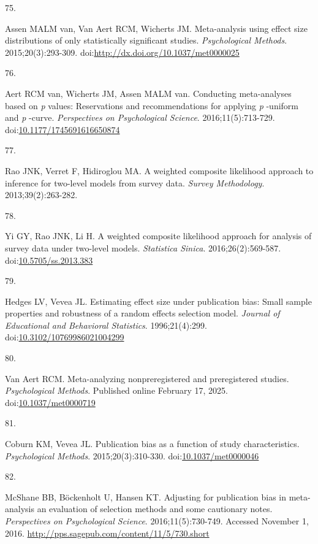 \documentclass[
  american,
  man, donotrepeattitle,floatsintext]{apa7}
\newlength{\cslhangindent}
\newlength{\csllabelwidth}
\newenvironment{CSLReferences}[2] %
 {\begin{list}{}{%
  \setlength{\itemindent}{0pt}
  \setlength{\leftmargin}{0pt}
  \setlength{\parsep}{0pt}
  \ifodd #1
   \setlength{\leftmargin}{\cslhangindent}
   \setlength{\itemindent}{-1\cslhangindent}
  \fi
  \setlength{\itemsep}{#2\baselineskip}}}
 {\end{list}}
\newcommand{\CSLLeftMargin}[1]{\parbox[t]{\csllabelwidth}{\strut#1\strut}}
\newcommand{\CSLRightInline}[1]{\parbox[t]{\linewidth - \csllabelwidth}{\strut#1\strut}}
\begin{document}
\begin{CSLReferences}{0}{1}
\CSLLeftMargin{75. }%
\CSLRightInline{Assen MALM van, Van Aert RCM, Wicherts JM. {Meta-analysis using effect size distributions of only statistically significant studies}. \emph{Psychological Methods}. 2015;20(3):293-309. doi:\url{http://dx.doi.org/10.1037/met0000025}}

\CSLLeftMargin{76. }%
\CSLRightInline{Aert RCM van, Wicherts JM, Assen MALM van. Conducting meta-analyses based on \emph{p} values: Reservations and recommendations for applying \emph{p} -uniform and \emph{p} -curve. \emph{Perspectives on Psychological Science}. 2016;11(5):713-729. doi:\href{https://doi.org/10.1177/1745691616650874}{10.1177/1745691616650874}}

\CSLLeftMargin{77. }%
\CSLRightInline{Rao JNK, Verret F, Hidiroglou MA. A weighted composite likelihood approach to inference for two-level models from survey data. \emph{Survey Methodology}. 2013;39(2):263-282.}

\CSLLeftMargin{78. }%
\CSLRightInline{Yi GY, Rao JNK, Li H. A weighted composite likelihood approach for analysis of survey data under two-level models. \emph{Statistica Sinica}. 2016;26(2):569-587. doi:\href{https://doi.org/10.5705/ss.2013.383}{10.5705/ss.2013.383}}

\CSLLeftMargin{79. }%
\CSLRightInline{Hedges LV, Vevea JL. {Estimating effect size under publication bias: Small sample properties and robustness of a random effects selection model}. \emph{Journal of Educational and Behavioral Statistics}. 1996;21(4):299. doi:\href{https://doi.org/10.3102/10769986021004299}{10.3102/10769986021004299}}

\CSLLeftMargin{80. }%
\CSLRightInline{Van Aert RCM. Meta-analyzing nonpreregistered and preregistered studies. \emph{Psychological Methods}. Published online February 17, 2025. doi:\href{https://doi.org/10.1037/met0000719}{10.1037/met0000719}}

\CSLLeftMargin{81. }%
\CSLRightInline{Coburn KM, Vevea JL. {Publication bias as a function of study characteristics}. \emph{Psychological Methods}. 2015;20(3):310-330. doi:\href{https://doi.org/10.1037/met0000046}{10.1037/met0000046}}

\CSLLeftMargin{82. }%
\CSLRightInline{McShane BB, Böckenholt U, Hansen KT. Adjusting for publication bias in meta-analysis an evaluation of selection methods and some cautionary notes. \emph{Perspectives on Psychological Science}. 2016;11(5):730-749. Accessed November 1, 2016. \url{http://pps.sagepub.com/content/11/5/730.short}}

\end{CSLReferences}

\endgroup
\end{document}
